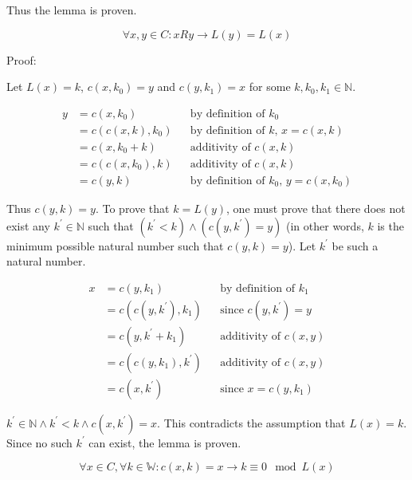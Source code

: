 \documentclass[11pt]{article}
\begin{document}
    Thus the lemma is proven.

    \begin{equation}
        \forall x,y \in C: xRy \rightarrow L(y) = L(x)
    \end{equation}

    Proof:

    Let $L(x)=k$, $c(x,k_{0})=y$ and $c(y,k_{1})=x$ for some $k,k_{0},k_{1} \in \mathbb{N}$.

    \begin{align*}
        \text{$y$} &= \text{$c(x,k_{0})$} && \text{by definition of $k_{0}$} \\
        &= \text{$c(c(x,k),k_{0})$} && \text{by definition of $k$, $x=c(x,k)$} \\
        &= \text{$c(x,k_{0}+k)$} && \text{additivity of $c(x,k)$} \\
        &= \text{$c(c(x,k_{0}),k)$} && \text{additivity of $c(x,k)$} \\
        &= \text{$c(y,k)$} && \text{by definition of $k_{0}$, $y=c(x,k_{0})$}
    \end{align*}

    Thus $c(y,k)=y$. To prove that $k=L(y)$, one must prove that there does not exist any $k^{'} \in \mathbb{N}$ such that $(k^{'}<k) \land (c(y,k^{'})=y)$ (in other words, $k$ is the minimum possible natural number such that $c(y,k)=y$). Let $k^{'}$ be such a natural number.

    \begin{align*}
        \text{$x$} &= \text{$c(y,k_{1})$} && \text{by definition of $k_{1}$} \\
        &= \text{$c(c(y,k^{'}),k_{1})$} && \text{since $c(y,k^{'})=y$} \\
        &= \text{$c(y,k^{'}+k_{1})$} && \text{additivity of $c(x,y)$} \\
        &= \text{$c(c(y,k_{1}),k^{'})$} && \text{additivity of $c(x,y)$} \\
        &= \text{$c(x,k^{'})$} && \text{since $x=c(y,k_{1})$}
    \end{align*}

    $k^{'} \in \mathbb{N} \land k^{'}<k \land c(x,k^{'})=x$. This contradicts the assumption that $L(x)=k$. Since no such $k^{'}$ can exist, the lemma is proven.

    \begin{equation}
        \forall x \in C, \forall k \in \mathbb{W}: c(x,k)=x \rightarrow k \equiv 0 \mod L(x)
    \end{equation}
\end{document}
